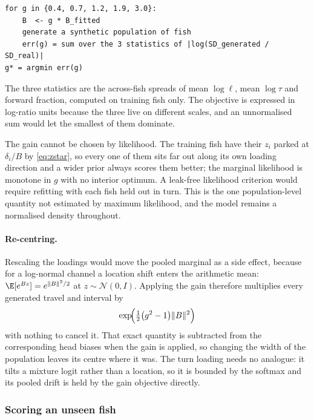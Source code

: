 \begin{center}
\begin{minipage}{0.86\textwidth}
\begin{verbatim}
for g in {0.4, 0.7, 1.2, 1.9, 3.0}:
    B  <- g * B_fitted
    generate a synthetic population of fish
    err(g) = sum over the 3 statistics of |log(SD_generated / SD_real)|
g* = argmin err(g)
\end{verbatim}
\end{minipage}
\end{center}

\noindent The three statistics are the across-fish spreads of mean $\log\ell$,
mean $\log\tau$ and forward fraction, computed on training fish only. The
objective is expressed in log-ratio units because the three live on different
scales, and an unnormalised sum would let the smallest of them dominate.

The gain cannot be chosen by likelihood. The training fish have their $z_i$
parked at $\delta_i/B$ by \eqref{eq:zstar}, so every one of them sits far out
along its own loading direction and a wider prior always scores them better;
the marginal likelihood is monotone in $g$ with no interior optimum. A
leak-free likelihood criterion would require refitting with each fish held out
in turn. This is the one population-level quantity not estimated by maximum
likelihood, and the model remains a normalised density throughout.

\paragraph{Re-centring.} Rescaling the loadings would move the pooled marginal
as a side effect, because for a log-normal channel a location shift enters the
arithmetic mean: $\E[e^{Bz}]=e^{\lVert B\rVert^2/2}$ at $z\sim\mathcal N(0,I)$.
Applying the gain therefore multiplies every generated travel and interval by
\begin{equation}
\exp\!\Bigl(\tfrac{1}{2}\bigl(g^2-1\bigr)\lVert B\rVert^2\Bigr)
\end{equation}
with nothing to cancel it. That exact quantity is subtracted from the
corresponding head biases when the gain is applied, so changing the width of
the population leaves its centre where it was. The turn loading needs no
analogue: it tilts a mixture logit rather than a location, so it is bounded by
the softmax and its pooled drift is held by the gain objective directly.

\subsubsection{Scoring an unseen fish}

